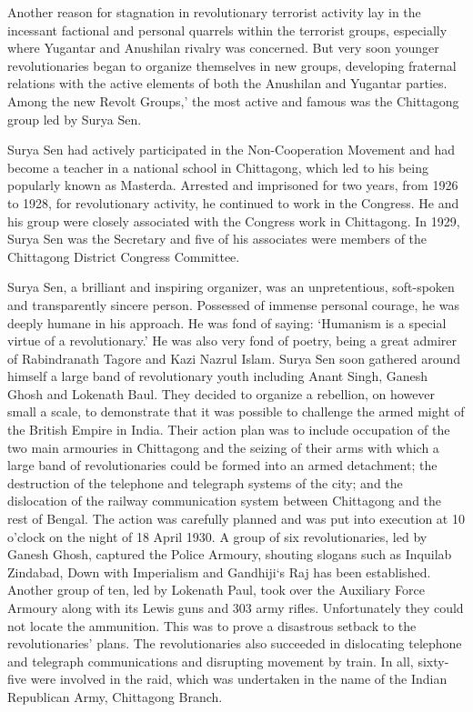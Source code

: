 Another reason for stagnation in revolutionary terrorist activity lay in the incessant factional and personal quarrels within the terrorist groups, especially where Yugantar and Anushilan rivalry was concerned. But very soon younger revolutionaries began to organize themselves in new groups, developing fraternal relations with the active elements of both the Anushilan and Yugantar parties. Among the new Revolt Groups,' the most active and famous was the Chittagong group led by Surya Sen.

Surya Sen had actively participated in the Non-Cooperation Movement and had become a teacher in a national school in Chittagong, which led to his being popularly known as Masterda. Arrested and imprisoned for two years, from 1926 to 1928, for revolutionary activity, he continued to work in the Congress. He and his group were closely associated with the Congress work in Chittagong. In 1929, Surya Sen was the Secretary and five of his associates were members of the Chittagong District Congress Committee.

Surya Sen, a brilliant and inspiring organizer, was an unpretentious, soft-spoken and transparently sincere person. Possessed of immense personal courage, he was deeply humane in his approach. He was fond of saying: `Humanism is a special virtue of a revolutionary.' He was also very fond of poetry, being a great admirer of Rabindranath Tagore and Kazi Nazrul Islam. Surya Sen soon gathered around himself a large band of revolutionary youth including Anant Singh, Ganesh Ghosh and Lokenath Baul. They decided to organize a rebellion, on however small a scale, to demonstrate that it was possible to challenge the armed might of the British Empire in India. Their action plan was to include occupation of the two main armouries in Chittagong and the seizing of their arms with which a large band of revolutionaries could be formed into an armed detachment; the destruction of the telephone and telegraph systems of the city; and the dislocation of the railway communication system between Chittagong and the rest of Bengal. The action was carefully planned and was put into execution at 10 o'clock on the night of 18 April 1930. A group of six revolutionaries, led by Ganesh Ghosh, captured the Police Armoury, shouting slogans such as Inquilab Zindabad, Down with Imperialism and Gandhiji`s Raj has been established. Another group of ten, led by Lokenath Paul, took over the Auxiliary Force Armoury along with its Lewis guns and 303 army rifles. Unfortunately they could not locate the ammunition. This was to prove a disastrous setback to the revolutionaries' plans. The revolutionaries also succeeded in dislocating telephone and telegraph communications and disrupting movement by train. In all, sixty- five were involved in the raid, which was undertaken in the name of the Indian Republican Army, Chittagong Branch.


